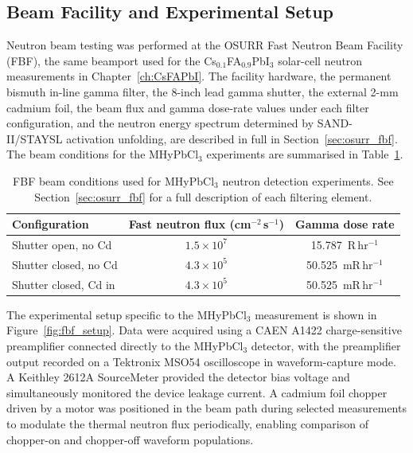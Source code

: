 \subsection{Beam Facility and Experimental Setup}
\label{sec:fbf_setup}

Neutron beam testing was performed at the OSURR Fast Neutron Beam
Facility (FBF), the same beamport used for the
Cs$_{0.1}$FA$_{0.9}$PbI$_3$ solar-cell neutron measurements in
Chapter~\ref{ch:CsFAPbI}.  The facility hardware, the permanent
bismuth in-line gamma filter, the 8-inch lead gamma shutter, the
external 2-mm cadmium foil, the beam flux and gamma dose-rate values
under each filter configuration, and the neutron energy spectrum
determined by SAND-II/STAYSL activation unfolding, are described in
full in Section~\ref{sec:osurr_fbf}.  The beam conditions for the
MHyPbCl$_3$ experiments are summarised in
Table~\ref{tab:fbf_conditions}.

\begin{table}[htbp]
\centering
\caption{FBF beam conditions used for MHyPbCl$_3$ neutron detection
         experiments.  See Section~\ref{sec:osurr_fbf} for a full
         description of each filtering element.}
\label{tab:fbf_conditions}
\startsinglespace
\begin{tabular}{lcc}
\hline
Configuration & Fast neutron flux (cm$^{-2}$\,s$^{-1}$)
              & Gamma dose rate \\
\hline
Shutter open, no Cd   & $1.5\times10^7$ & 15.787~R\,hr$^{-1}$  \\
Shutter closed, no Cd & $4.3\times10^5$ & 50.525~mR\,hr$^{-1}$ \\
Shutter closed, Cd in & $4.3\times10^5$ & 50.525~mR\,hr$^{-1}$ \\
\hline
\end{tabular}
\end{table}

The experimental setup specific to the MHyPbCl$_3$ measurement is
shown in Figure~\ref{fig:fbf_setup}.  Data were acquired using a
CAEN A1422 charge-sensitive preamplifier connected directly to the
MHyPbCl$_3$ detector, with the preamplifier output recorded on a
Tektronix MSO54 oscilloscope in waveform-capture mode.  A Keithley
2612A SourceMeter provided the detector bias voltage and
simultaneously monitored the device leakage current.  A cadmium
foil chopper driven by a motor was positioned in the beam path
during selected measurements to modulate the thermal neutron flux
periodically, enabling comparison of chopper-on and chopper-off
waveform populations.

